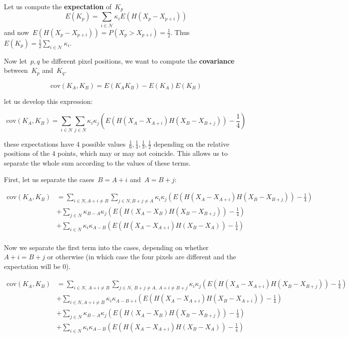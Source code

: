 \documentclass[12pt]{article}                  %
\begin{document}
Let us compute the {\bf expectation} of~$K_p$
\[
	E(K_p) = \sum_{i\in\mathcal{N}} \kappa_i E(H(X_p - X_{p+i}))
\]
and now~$E(H(X_p-X_{p+i}))=P(X_p>X_{p+i})=\frac12$.
Thus~$E(K_p)=\frac12\sum_{i\in\mathcal{N}}\kappa_i$.

Now let~$p,q$ be different pixel positions, we want to compute the
{\bf covariance} between~$K_p$ and~$K_q$.

\[
	\mathrm{cov}(K_A,K_B)
	=
	E(K_AK_B)-E(K_A)E(K_B)
\]

let us develop this expression:

\[
	\mathrm{cov}(K_A,K_B)
	=
	\sum_{i\in N}
	\sum_{j\in N}
	\kappa_i\kappa_j
	\left(
	E
	\left(
	H(X_A-X_{A+i})H(X_B-X_{B+j})
	\right)
	-\frac14
	\right)
\]

these expectations have 4 possible values~$\frac16,\frac14,\frac13,\frac12$
depending on the relative positions of the 4 points, which may or may not
coincide.  This allows us to separate the whole sum according to the values of
these terms.

First, let us separate the cases~$B=A+i$ and~$A=B+j$:

\begin{align*}
	\mathrm{cov}(K_A,K_B)
	&=
	\sum_{i\in N,A+i\neq B}
	\sum_{j\in N,B+j\neq A}
	\kappa_i\kappa_j
	\left(
	E
	\left(
	H(X_A-X_{A+i})H(X_B-X_{B+j})
	\right)
	-\frac14
	\right)\\
	&+
	\sum_{j\in N}
	\kappa_{B-A}\kappa_j
	\left(
	E
	\left(
	H(X_A-X_B)H(X_B-X_{B+j})
	\right)
	-\frac14
	\right)\\
	&+
	\sum_{i\in N}
	\kappa_i\kappa_{A-B}
	\left(
	E
	\left(
	H(X_A-X_{A+i})H(X_B-X_A)
	\right)
	-\frac14
	\right)\\
\end{align*}

Now we separate the first term into the cases, depending on
whether~$A+i=B+j$ or otherwise (in which case the four pixels are different
and the expectation will be 0).


\begin{align*}
	\mathrm{cov}(K_A,K_B)
	&=
	\sum_{i\in N,\ A+i\neq B}
	\sum_{j\in N,\ B+j\neq A,\ A+i\neq B+j}
	\kappa_i\kappa_j
	\left(
	E
	\left(
	H(X_A-X_{A+i})H(X_B-X_{B+j})
	\right)
	-\frac14
	\right)\\
	&+
	\sum_{i\in N,A+i\neq B}
	\kappa_i\kappa_{A-B+i}
	\left(
	E
	\left(
	H(X_A-X_{A+i})H(X_B-X_{A+i})
	\right)
	-\frac14
	\right)\\
	&+
	\sum_{j\in N}
	\kappa_{B-A}\kappa_j
	\left(
	E
	\left(
	H(X_A-X_B)H(X_B-X_{B+j})
	\right)
	-\frac14
	\right)\\
	&+
	\sum_{i\in N}
	\kappa_i\kappa_{A-B}
	\left(
	E
	\left(
	H(X_A-X_{A+i})H(X_B-X_A)
	\right)
	-\frac14
	\right)\\
\end{align*}
\end{document}
